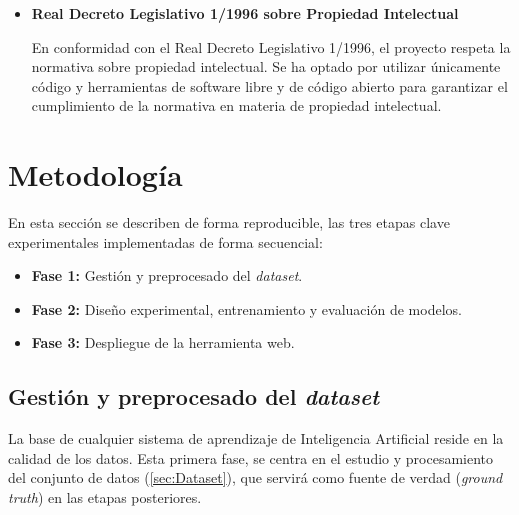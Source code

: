 \documentclass[12pt,a4paper,onecolumn,oneside]{report}
\begin{document}
\begin{itemize}
    \item \textbf{Real Decreto Legislativo 1/1996 sobre Propiedad Intelectual}\cite{RDL1996}
    
    En conformidad con el Real Decreto Legislativo 1/1996, el proyecto respeta la normativa sobre propiedad intelectual. Se ha optado por utilizar 
    únicamente código y herramientas de software libre y de código abierto para garantizar el cumplimiento de la normativa en materia de propiedad 
    intelectual.

\end{itemize}


\chapter{Metodología} %
\label{metodologia}

En esta sección se describen de forma reproducible, las tres etapas clave experimentales implementadas de forma secuencial: 
\begin{itemize}
  \item \textbf{Fase 1:} Gestión y preprocesado del \textit{dataset}.
  \item \textbf{Fase 2:} Diseño experimental, entrenamiento y evaluación de modelos.
  \item \textbf{Fase 3:} Despliegue de la herramienta web.
\end{itemize}

\section{Gestión y preprocesado del \textit{dataset}}
\label{Gestión y preprocesado del dataset}

La base de cualquier sistema de aprendizaje de Inteligencia Artificial reside en la calidad de los datos. Esta primera fase, se centra en el estudio y procesamiento del conjunto de datos (\autoref{sec:Dataset}), que servirá como
fuente de verdad (\textit{ground truth}) en las etapas posteriores.
\end{document}
